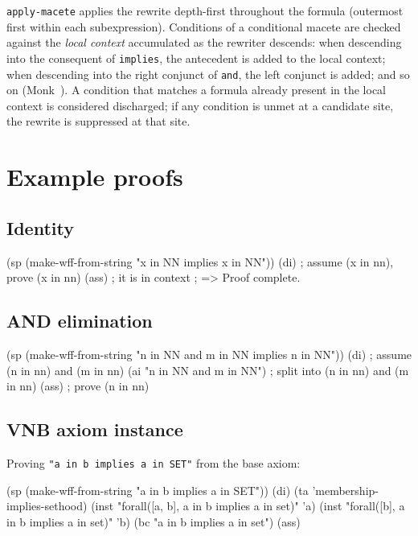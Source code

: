 \begin{remark}
\texttt{apply-macete} applies the rewrite depth-first throughout the
formula (outermost first within each subexpression).  Conditions of a
conditional macete are checked against the \emph{local context}
accumulated as the rewriter descends: when descending into the
consequent of \texttt{implies}, the antecedent is added to the local
context; when descending into the right conjunct of \texttt{and}, the
left conjunct is added; and so on (Monk~\cite{Monk1988}).  A condition that
matches a formula already present in the local context is considered
discharged; if any condition is unmet at a candidate site, the rewrite
is suppressed at that site.
\end{remark}

\section{Example proofs}

\subsection{Identity}

\begin{VNBcode}
(sp (make-wff-from-string "x in NN implies x in NN"))
(di)    ; assume (x in nn), prove (x in nn)
(ass)   ; it is in context
; => Proof complete.
\end{VNBcode}

\subsection{AND elimination}

\begin{VNBcode}
(sp (make-wff-from-string "n in NN and m in NN implies n in NN"))
(di)                          ; assume (n in nn) and (m in nn)
(ai "n in NN and m in NN")   ; split into (n in nn) and (m in nn)
(ass)                         ; prove (n in nn)
\end{VNBcode}

\subsection{VNB axiom instance}

Proving \texttt{"a in b implies a in SET"} from the base axiom:

\begin{VNBcode}
(sp (make-wff-from-string "a in b implies a in SET"))
(di)
(ta 'membership-implies-sethood)
(inst "forall([a, b], a in b implies a in set)" 'a)
(inst "forall([b], a in b implies a in set)" 'b)
(bc "a in b implies a in set")
(ass)
\end{VNBcode}

